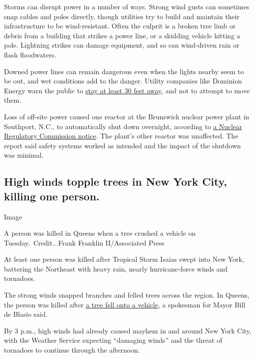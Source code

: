 Storms can disrupt power in a number of ways. Strong wind gusts can
sometimes snap cables and poles directly, though utilities try to build
and maintain their infrastructure to be wind-resistant. Often the
culprit is a broken tree limb or debris from a building that strikes a
power line, or a skidding vehicle hitting a pole. Lightning strikes can
damage equipment, and so can wind-driven rain or flash floodwaters.

Downed power lines can remain dangerous even when the lights nearby seem
to be out, and wet conditions add to the danger. Utility companies like
Dominion Energy warn the public to
\href{https://twitter.com/DominionEnergy/status/1290609115954323457}{stay
at least 30 feet away}, and not to attempt to move them.

Loss of off-site power caused one reactor at the Brunswick nuclear power
plant in Southport, N.C., to automatically shut down overnight,
according to
\href{https://www.nrc.gov/reading-rm/doc-collections/event-status/event/2020/20200804en.html}{a
Nuclear Regulatory Commission notice}. The plant's other reactor was
unaffected. The report said safety systems worked as intended and the
impact of the shutdown was minimal.

\hypertarget{high-winds-topple-trees-in-new-york-city-killing-one-person}{%
\subsection{High winds topple trees in New York City, killing one
person.}\label{high-winds-topple-trees-in-new-york-city-killing-one-person}}

Image

A person was killed in Queens when a tree crushed a vehicle on
Tuesday.~Credit...Frank Franklin II/Associated Press

At least one person was killed after Tropical Storm Isaias swept into
New York, battering the Northeast with heavy rain, nearly
hurricane-force winds and tornadoes.

The strong winds snapped branches and felled trees across the region. In
Queens, the person was killed after
\href{https://1010wins.radio.com/articles/tree-falls-onto-parked-vehicle-in-queens-killing-1-person}{a
tree fell onto a vehicle}, a spokesman for Mayor Bill de Blasio said.

By 3 p.m., high winds had already caused mayhem in and around New York
City, with the Weather Service expecting ``damaging winds'' and the
threat of tornadoes to continue through the afternoon.

